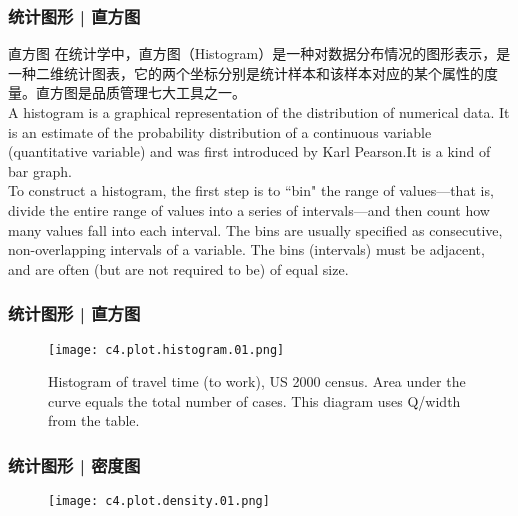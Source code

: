 \begin{frame}
  \frametitle{统计图形 | 直方图}
  \begin{block}{直方图}
在统计学中，直方图（Histogram）是一种对数据分布情况的图形表示，是一种二维统计图表，它的两个坐标分别是统计样本和该样本对应的某个属性的度量。直方图是品质管理七大工具之一。\\
    \vspace{0.5em}
    A histogram is a graphical representation of the distribution of numerical data. It is an estimate of the probability distribution of a continuous variable (quantitative variable) and was first introduced by Karl Pearson.It is a kind of bar graph.\\
    \vspace{0.5em}
    To construct a histogram, the first step is to ``bin" the range of values—that is, divide the entire range of values into a series of intervals—and then count how many values fall into each interval. The bins are usually specified as consecutive, non-overlapping intervals of a variable. The bins (intervals) must be adjacent, and are often (but are not required to be) of equal size.
  \end{block}
\end{frame}

\begin{frame}
  \frametitle{统计图形 | 直方图}
  \begin{figure}
    \centering
    \texttt{[image: c4.plot.histogram.01.png]}
    \caption{Histogram of travel time (to work), US 2000 census. Area under the curve equals the total number of cases. This diagram uses Q/width from the table.}
  \end{figure}
\end{frame}

\begin{frame}
  \frametitle{统计图形 | 密度图}
  \begin{figure}
    \centering
    \texttt{[image: c4.plot.density.01.png]}
  \end{figure}
\end{frame}

